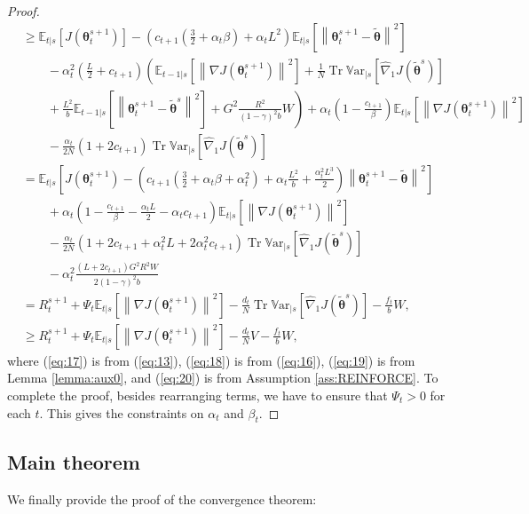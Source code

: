 \documentclass{article}
\theoremstyle{remark}
\theoremstyle{definition}
\DeclareMathOperator{\Tr}{Tr}
\newcommand{\norm}[2][\infty]{\left\|#2\right\|_{#1}}
\newcommand{\vtheta}{\boldsymbol{\theta}}
\newcommand{\gradJ}[1]{\nabla J(#1)}
\newcommand{\gradApp}[2]{\widehat{\nabla}_{#2}J(#1)}
\newcommand{\Ets}[2][t]{\mathbb{E}_{#1\vert s}\left[#2\right]}
\newcommand{\Varts}[2][t]{{\mathbb{V}\text{ar}}_{#1\vert s}\left[#2\right]}
\newcommand{\VARRF}{V}
\newcommand{\VARIS}{W}
\begin{document}
\begin{proof}
\begin{align}
	&\geq  \Ets{J(\vtheta_t^{s+1})} - \left(c_{t+1}\left(\frac{3}{2}+\alpha_t\beta\right)+\alpha_tL^2\right)\Ets{\norm[]{\vtheta_{t}^{s+1}-\tilde{\vtheta}}^2} \nonumber\\
	&\qquad
	-\alpha_t^2\left(\frac{L}{2}+c_{t+1}\right)\left(\Ets[t-1]{\norm[]{\gradJ{\vtheta_t^{s+1}}}^2} 
	+\frac{1}{N}\Tr\Varts[]{\gradApp{\tilde{\vtheta}^s}{1}}
	\right.\nonumber\\
	&\left.\qquad+\frac{L^2}{b}\Ets[t-1]{\norm[]{\vtheta_t^{s+1}-\tilde{\vtheta}^s}^2}
	+G^2\frac{R^2}{(1-\gamma)^2b}W\right)
	+\alpha_t\left(1-\frac{c_{t+1}}{\beta}\right)\Ets{\norm[]{\gradJ{\vtheta_t^{s+1}}}^2} \nonumber\\
	&\qquad-\frac{\alpha_t}{2N}\left(1+2c_{t+1}\right)\Tr\Varts[]{\gradApp{\tilde{\vtheta}^s}{1}} \label{eq:19}\\
	& = \Ets{J(\vtheta_t^{s+1}) - \left(c_{t+1}\left(\frac{3}{2}+\alpha_t\beta+\alpha_t^2\right)+\alpha_t\frac{L^2}{b}+\frac{\alpha_t^2L^3}{2}\right)\norm[]{\vtheta_{t}^{s+1}-\tilde{\vtheta}}^2} \nonumber\\
	&\qquad
	+\alpha_t\left(1-\frac{c_{t+1}}{\beta}-\frac{\alpha_tL}{2}-\alpha_tc_{t+1}\right)\Ets{\norm[]{\gradJ{\vtheta_t^{s+1}}}^2} \nonumber\\
	&\qquad-\frac{\alpha_t}{2N}\left(1+2c_{t+1}+\alpha_t^2L+2\alpha_t^2c_{t+1}\right)\Tr\Varts[]{\gradApp{\tilde{\vtheta}^s}{1}} \nonumber\\
	&\qquad-\alpha_t^2\frac{(L+2c_{t+1})G^2R^2\VARIS}{2(1-\gamma)^2b} \nonumber\\
	&= R_t^{s+1}
	+\Psi_t\Ets{\norm[]{\gradJ{\vtheta_t^{s+1}}}^2}
	-\frac{d_t}{N}\Tr\Varts[]{\gradApp{\tilde{\vtheta}^s}{1}}
	-\frac{f_t}{b}\VARIS,\nonumber\\
	&\geq R_t^{s+1}
	+\Psi_t\Ets{\norm[]{\gradJ{\vtheta_t^{s+1}}}^2}
	-\frac{d_t}{N}\VARRF
	-\frac{f_t}{b}\VARIS, \label{eq:20}
\end{align}
where (\ref{eq:17}) is from (\ref{eq:13}), (\ref{eq:18}) is from (\ref{eq:16}), (\ref{eq:19}) is from Lemma \ref{lemma:aux0}, and (\ref{eq:20}) is from Assumption \ref{ass:REINFORCE}.
To complete the proof, besides rearranging terms, we have to ensure that $\Psi_t>0$ for each $t$. This gives the constraints on $\alpha_t$ and $\beta_t$.
\end{proof}


\subsection*{Main theorem}
We finally provide the proof of the convergence theorem:
\end{document}
